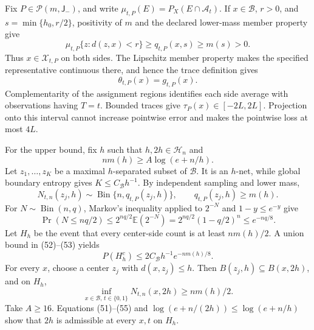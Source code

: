 Fix \(P\in\mathcal P(m,\mathsf J_{-})\), and write
\(\mu_{t,P}(E)=P_X(E\cap\mathcal A_t)\).  If \(x\in\mathcal B\),
\(r>0\), and \(s=\min\{h_0,r/2\}\), positivity of \(m\) and the declared
lower-mass member property give
\[
 \mu_{t,P}\{z:d(z,x)<r\}\ge q_{t,P}(x,s)\ge m(s)>0.
 \tag{49}
\]
Thus \(x\in\mathcal X_{t,P}\) on both sides.  The Lipschitz member
property makes the specified representative continuous there, and hence
the trace definition gives
\[
 \theta_{t,P}(x)=g_{t,P}(x).
 \tag{50}
\]
Complementarity of the assignment regions identifies each side average
with observations having \(T=t\).  Bounded traces give
\(\tau_P(x)\in[-2L,2L]\).  Projection onto this interval cannot increase
pointwise error and makes the pointwise loss at most \(4L\).

For the upper bound, fix \(h\) such that \(h,2h\in\mathcal H_n\) and
\[
 nm(h)\ge A\log(e+n/h).
 \tag{51}
\]
Let \(z_1,\ldots,z_K\) be a maximal \(h\)-separated subset of
\(\mathcal B\).  It is an \(h\)-net, while global boundary entropy gives
\(K\le C_{\mathcal B}h^{-1}\).  By independent sampling and lower mass,
\[
 N_{t,n}(z_j,h)\sim\operatorname{Bin}\{n,q_{t,P}(z_j,h)\},
 \qquad q_{t,P}(z_j,h)\ge m(h).
 \tag{52}
\]
For \(N\sim\operatorname{Bin}(n,q)\), Markov's inequality applied to
\(2^{-N}\) and \(1-y\le e^{-y}\) give
\[
 \Pr(N\le nq/2)
 \le2^{nq/2}\mathbb E(2^{-N})
 =2^{nq/2}(1-q/2)^n
 \le e^{-nq/8}.
 \tag{53}
\]
Let \(H_h\) be the event that every center-side count is at least
\(nm(h)/2\).  A union bound in (52)--(53) yields
\[
 P(H_h^c)\le2C_{\mathcal B}h^{-1}e^{-nm(h)/8}.
 \tag{54}
\]
For every \(x\), choose a center \(z_j\) with \(d(x,z_j)\le h\).  Then
\(B(z_j,h)\subseteq B(x,2h)\), and on \(H_h\),
\[
 \inf_{x\in\mathcal B,\,t\in\{0,1\}}N_{t,n}(x,2h)
 \ge nm(h)/2.
 \tag{55}
\]
Take \(A\ge16\).  Equations (51)--(55) and
\(\log(e+n/(2h))\le\log(e+n/h)\) show that \(2h\) is admissible at every
\(x,t\) on \(H_h\).

